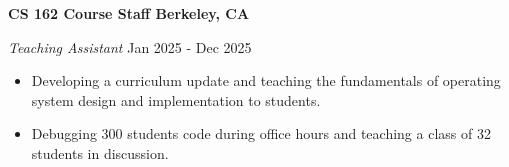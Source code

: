 \textbf{CS 162 Course Staff \hfill Berkeley, CA}\par
\textit{Teaching Assistant} \hfill Jan 2025 - Dec 2025
\begin{itemize}
\item Developing a curriculum update and teaching the fundamentals of operating system design and implementation to students.
\item Debugging 300 students code during office hours and teaching a class of 32 students in discussion.
\end{itemize}\par